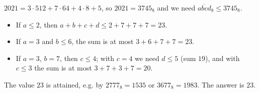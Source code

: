 $2021=3\cdot512+7\cdot64+4\cdot8+5$, so $2021=3745_8$ and we need $\overline{abcd}_8\le3745_8$.
\begin{itemize}
\item If $a\le2$, then $a+b+c+d\le2+7+7+7=23$.
\item If $a=3$ and $b\le6$, the sum is at most $3+6+7+7=23$.
\item If $a=3$, $b=7$, then $c\le4$; with $c=4$ we need $d\le5$ (sum $19$), and with $c\le3$ the sum is at most $3+7+3+7=20$.
\end{itemize}
The value $23$ is attained, e.g. by $2777_8=1535$ or $3677_8=1983$. The answer is $\boxed{23}$.

